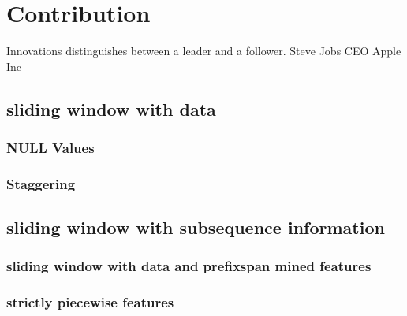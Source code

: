 \chapter{Contribution}\label{sec:contribution}

Innovations distinguishes between a leader and a follower. Steve Jobs CEO Apple Inc

\section{sliding window with data}
\subsection{NULL Values}
\subsection{Staggering}

\section{sliding window with subsequence information}
\subsection{sliding window with data and prefixspan mined features}
\subsection{strictly piecewise features}



